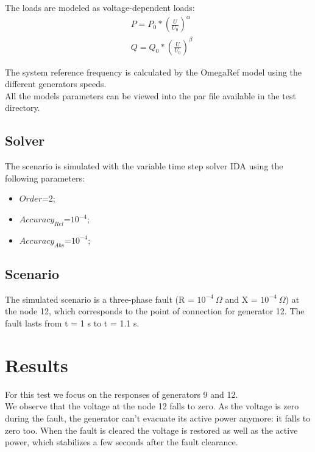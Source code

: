 \documentclass[a4paper, 12pt]{report}
\begin{document}
The loads are modeled as voltage-dependent loads:
\begin{equation*}
\begin{aligned}
& P = P_{0} * (\frac{U}{U_{0}})^\alpha \\
& Q = Q_{0} * (\frac{U}{U_{0}})^\beta
\end{aligned}
\label{Voltage-dependent load model}
\end{equation*}

The system reference frequency is calculated by the OmegaRef model using the different generators speeds.\\

All the models parameters can be viewed into the par file available in the test directory.

\subsection{Solver}
The scenario is simulated with the variable time step solver IDA using the following parameters:
\begin{itemize}
\item $Order$=2;
\item $Accuracy_{Rel}$=$10^{-4}$;
\item $Accuracy_{Abs}$=$10^{-4}$;
\end{itemize}

\subsection{Scenario}
The simulated scenario is a three-phase fault (R = $10^{-4} \ \Omega$ and X = $10^{-4} \ \Omega$) at the node 12, which corresponds to the point of connection for generator 12. The fault lasts from t = 1 s to t = 1.1 s.

\newpage
\section{Results}

For this test we focus on the responses of generators 9 and 12.\\

We observe that the voltage at the node 12 falls to zero. As the voltage is zero during the fault, the generator can't evacuate its active power anymore: it falls to zero too. When the fault is cleared the voltage is restored as well as the active power, which stabilizes a few seconds after the fault clearance.\\
\end{document}
